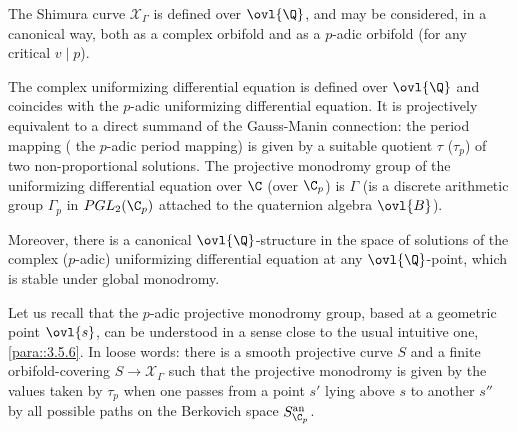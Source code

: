 \begin{thm}\label{thm::4.7.4} The Shimura curve $\mathcal{X}_\Gamma$ is
 defined over $\ovl{\Q}$, and may be considered, in a canonical way,
 both as a complex orbifold and as a $p$-adic orbifold (for any critical
 $v\mid p$).

 \noindent The complex uniformizing differential equation is defined over
 $\ovl{\Q}$ and coincides with the $p$-adic uniformizing differential
 equation. It is projectively equivalent to a 
 direct summand of the Gauss-Manin connection: the period mapping (\resp
 the $p$-adic period mapping) is given by a suitable quotient
 $\tau $ (\resp $\tau_p$) of two non-proportional solutions. The
 projective monodromy group of the uniformizing differential 
 equation over $\C$ (\resp over $\C_p$) is $\Gamma$ (\resp is a discrete
 arithmetic group $\Gamma_p$ in $PGL_2(\C_p)$ 
 attached to the quaternion algebra $\ovl{B}$).

 \noindent Moreover, there is a canonical $\ovl{\Q}$-structure in the
 space of solutions of the complex (\resp $p$-adic) uniformizing
 differential equation at any $\ovl{\Q}$-point, which is stable under
 global monodromy.
\end{thm}
Let us recall that the $p$-adic projective monodromy group, based at a
geometric point $\ovl{s}$, can be understood in a 
sense close to the usual intuitive one, \cf \ref{para::3.5.6}. In loose
words: there is a smooth projective curve $S$ and a finite 
orbifold-covering
$S\to \mathcal{X}_\Gamma$ such that the projective monodromy is given by
the values taken by $\tau_p$ when one passes 
from a point $ s'$ lying above $ s$ to another $ s''$ by all possible
paths on the Berkovich space $S_{\C_p}^{\mathrm{an}}$.

